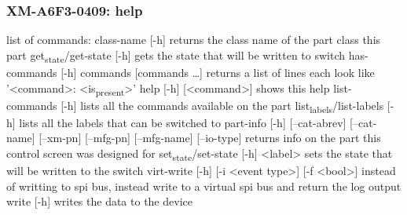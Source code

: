 \documentclass[11pt]{article}
\begin{document}
\subsubsection{XM-A6F3-0409: help}
\label{sec:org1d8cacc}
list of commands:
  class-name [-h]
    returns the class name of the part class this part
  get\textsubscript{state}/get-state [-h]
    gets the state that will be written to switch
  has-commands [-h] commands [commands \ldots{}]
    returns a list of lines each look like '<command>: <is\textsubscript{present}>'
  help [-h] [<command>]
    shows this help
  list-commands [-h]
    lists all the commands available on the part
  list\textsubscript{labels}/list-labels [-h]
    lists all the labels that can be switched to
  part-info  [-h] [--cat-abrev] [--cat-name] [--xm-pn] [--mfg-pn] [--mfg-name]
          [--io-type]
    returns info on the part this control screen was designed for
  set\textsubscript{state}/set-state [-h] <label>
    sets the state that will be written to the switch
  virt-write [-h] [-i <event type>] [-f <bool>]
    instead of writting to spi bus, instead write to a virtual spi bus
    and return the log output
  write [-h]
    writes the data to the device
\end{document}
